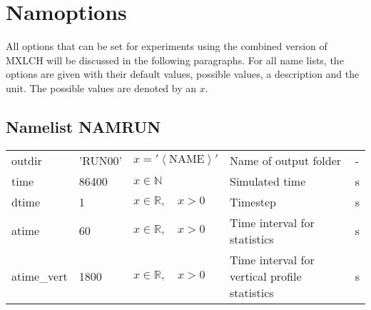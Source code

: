 \documentclass[twoside,11pt,fleqn,a4paper,english,openright]{report}
\begin{document}
\chapter{Namoptions}\label{chapter:namoptions}

All options that can be set for experiments using the combined version of MXLCH will be discussed in the following paragraphs. For all name lists, the options are given with their default values, possible values, a description and the unit. The possible values are denoted by an $x$. 

\section{Namelist NAMRUN}\label{par:namrun}

\begin{center}
  \tablehead{
  }
  \tabletail{
  }
  \tablelasttail{
        &&&&\\\hline
  }
\begin{supertabular}{|l|p{1.6cm}|p{4cm}|p{6.3cm}|l|}
  outdir	& 'RUN00'		& $x = '\left<\text{NAME}\right>'$	& Name of output folder 	& -\\
  time		& 86400			& $x \in \mathbb{N} $								& Simulated time					& s\\
  dtime		& 1				&	$x \in \mathbb{R}, \quad x > 0$		& Timestep								&	s\\
  atime		& 60				& $x \in \mathbb{R}, \quad x > 0$		& Time interval for statistics	&	s\\
  atime\_vert	&	1800	& $x \in \mathbb{R}, \quad x > 0$		& Time interval for vertical profile statistics	&	s\\

\end{supertabular}
\end{center}
\end{document}
